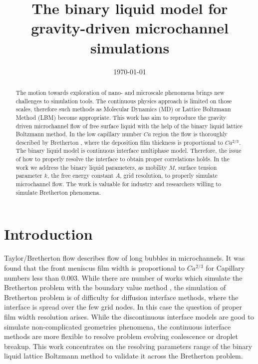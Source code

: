 \documentclass{article}
\title{The binary liquid model for gravity-driven microchannel simulations}
\date{\today}
\begin{document}
\maketitle

\begin{abstract}
The motion towards exploration of nano- and microscale phenomena brings new
challenges to simulation tools. The continuous physics approach is limited on
those scales, therefore such methods as Molecular Dynamics (MD) or Lattice
Boltzmann Method (LBM) become appropriate. This work has aim to
reproduce the gravity driven microchannel flow of free surface liquid with the
help of the binary liquid lattice Boltzmann method. In the low capillary number
$Ca$ region the flow is thoroughly described by Bretherton \cite{bretherton},
where the deposition film thickness is proportional to $Ca^{2/3}$. The binary
liquid model is continuous interface multiphase model. Therefore, the issue of
how to properly resolve the interface to obtain proper correlations holds. In
the work we address the binary liquid parameters, as mobility $M$, surface
tension parameter $k$, the free energy constant $A$, grid resolution, to
properly simulate microchannel flow. The work is valuable for industry and
researchers willing to simulate Bretherton phenomena.
\end{abstract}


\section{Introduction}
Taylor/Bretherton \cite{bretherton} flow describes flow of long bubbles in
microchannels. It was found that the front meniscus film width is proportional
to $Ca^{2/3}$ for Capillary numbers less than $0.003$. While there are number
of works which simulate the Bretherton problem with the boundary value method
\cite{ingham-plates,heil-bretherton}, the simulation of Bretherton problem is of
difficulty for diffusion interface methods, where the interface is spread over
the few grid nodes. In this case the question of proper film width resolution
arises. While the discontinuous interface models are good to simulate
non-complicated geometries phenomena, the continuous interface methods are more
flexible to resolve problem evolving coalescence or droplet breakup. This work
concentrates on the resolving parameters range of the binary liquid lattice
Boltzmann method to validate it across the Bretherton problem. 
\end{document}
